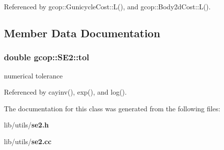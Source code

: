 \-Referenced by gcop\-::\-Gunicycle\-Cost\-::\-L(), and gcop\-::\-Body2d\-Cost\-::\-L().



\subsection{\-Member \-Data \-Documentation}
\subsubsection[{tol}]{\setlength{\rightskip}{0pt plus 5cm}double {\bf gcop\-::\-S\-E2\-::tol}}\label{classgcop_1_1SE2_a20743c73439f6aca32536534e012a11a}


numerical tolerance 



\-Referenced by cayinv(), exp(), and log().



\-The documentation for this class was generated from the following files\-:\begin{DoxyCompactItemize}
\item 
lib/utils/{\bf se2.\-h}\item 
lib/utils/{\bf se2.\-cc}\end{DoxyCompactItemize}
